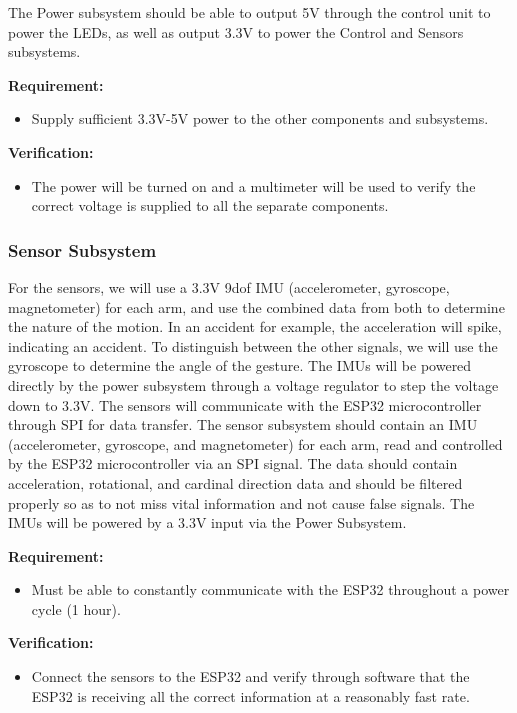 \documentclass[12pt]{article}
\begin{document}
    The Power subsystem should be able to output 5V through the control unit to power the LEDs, as well as output 3.3V to power the Control and Sensors subsystems. 

    \textbf{Requirement:} 
    \begin{itemize}
        \item Supply sufficient 3.3V-5V power to the 
        other components and subsystems.
    \end{itemize}


    \textbf{Verification:} 
    \begin{itemize}
        \item The power will be turned on and a 
        multimeter will be used to verify the correct voltage is 
        supplied to all the separate components.
    \end{itemize}
    \subsubsection{Sensor Subsystem} 
    For the sensors, we will use a 3.3V 9dof IMU (accelerometer, 
    gyroscope, magnetometer) \cite{STMicroelectronics2015LSM9DS1} for each arm, and use the combined 
    data from both to determine the nature of the motion. In an 
    accident for example, the acceleration will spike, indicating 
    an accident. To distinguish between the other signals, we will
    use the gyroscope to determine the angle of the gesture. The 
    IMUs will be powered directly by the power subsystem through 
    a voltage regulator to step the voltage down to 3.3V. The 
    sensors will communicate with the ESP32 microcontroller 
    through SPI for data transfer. 
    The sensor subsystem should contain an IMU (accelerometer, gyroscope, and magnetometer) for each arm, read and controlled by the ESP32 microcontroller via an SPI signal. The data should contain acceleration, rotational, and cardinal direction data and should be filtered properly so as to not miss vital information and not cause false signals. The IMUs will be powered by a 3.3V input via the Power Subsystem.

    \textbf{Requirement:}
    \begin{itemize}
        \item Must be able to constantly communicate with the 
        ESP32 throughout a power cycle (1 hour). 
    \end{itemize}
    
    
    \textbf{Verification:}
    \begin{itemize}
        \item Connect the sensors to the ESP32 and verify 
        through software that the ESP32 is receiving all the 
        correct information at a reasonably fast rate. 
    
    \end{itemize}
\end{document}
